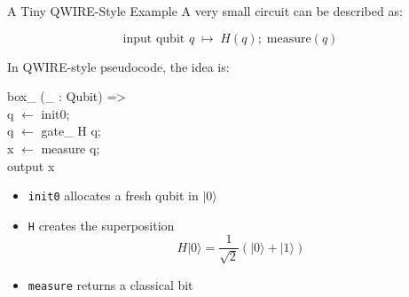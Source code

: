 \documentclass[aspectratio=169]{beamer}
\begin{document}
\begin{frame}{A Tiny QWIRE-Style Example}
\justifying
A very small circuit can be described as:

\vspace{0.5em}
\[
\text{input qubit } q \;\mapsto\; H(q);\; \text{measure}(q)
\]

\vspace{0.7em}
In QWIRE-style pseudocode, the idea is:

\begin{center}
\begin{minipage}{0.82\textwidth}
\ttfamily
box\_ (\_ : Qubit) =>\\
\hspace*{1.5em}q $\leftarrow$ init0;\\
\hspace*{1.5em}q $\leftarrow$ gate\_ H q;\\
\hspace*{1.5em}x $\leftarrow$ measure q;\\
\hspace*{1.5em}output x
\end{minipage}
\end{center}

\begin{itemize}
    \item \texttt{init0} allocates a fresh qubit in $\lvert 0 \rangle$
    \item \texttt{H} creates the superposition
    \[
      H\lvert 0 \rangle = \frac{1}{\sqrt{2}}(\lvert 0 \rangle + \lvert 1 \rangle)
    \]
    \item \texttt{measure} returns a classical bit
\end{itemize}
\end{frame}
\end{document}
